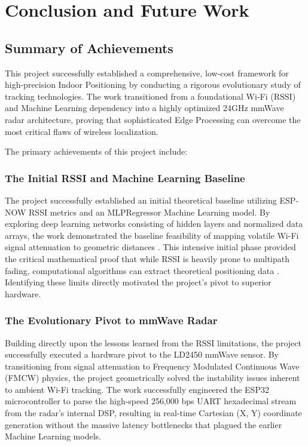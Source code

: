 \chapter{Conclusion and Future Work}
\label{Conclusion_and_Future_Work}

\section{Summary of Achievements}

This project successfully established a comprehensive, low-cost framework for high-precision Indoor Positioning by conducting a rigorous evolutionary study of tracking technologies. The work transitioned from a foundational Wi-Fi (RSSI) and Machine Learning dependency into a highly optimized 24GHz mmWave radar architecture, proving that sophisticated Edge Processing can overcome the most critical flaws of wireless localization. 

The primary achievements of this project include:

\subsection{The Initial RSSI and Machine Learning Baseline}
The project successfully established an initial theoretical baseline utilizing ESP-NOW RSSI metrics and an MLPRegressor Machine Learning model. By exploring deep learning networks consisting of hidden layers and normalized data arrays, the work demonstrated the baseline feasibility of mapping volatile Wi-Fi signal attenuation to geometric distances \cite{xiao2016indoor}. This intensive initial phase provided the critical mathematical proof that while RSSI is heavily prone to multipath fading, computational algorithms can extract theoretical positioning data \cite{zhang2019deep}. Identifying these limits directly motivated the project's pivot to superior hardware.

\subsection{The Evolutionary Pivot to mmWave Radar}
Building directly upon the lessons learned from the RSSI limitations, the project successfully executed a hardware pivot to the LD2450 mmWave sensor. By transitioning from signal attenuation to Frequency Modulated Continuous Wave (FMCW) physics, the project geometrically solved the instability issues inherent to ambient Wi-Fi tracking. The work successfully engineered the ESP32 microcontroller to parse the high-speed 256,000 bps UART hexadecimal stream from the radar's internal DSP, resulting in real-time Cartesian (X, Y) coordinate generation without the massive latency bottlenecks that plagued the earlier Machine Learning models.


